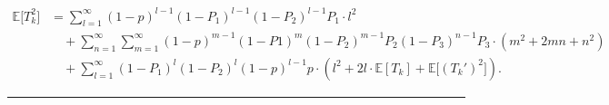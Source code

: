 \documentclass{IEEEtran}
\begin{document}
\begin{figure*}
	\begin{equation}\label{T^2}
	\begin{aligned}
	\mathbb{E}\big[T_k^2\big]&=\sum_{l=1}^{\infty}(1-p)^{l-1}(1-P_1)^{l-1}(1-P_2)^{l-1}P_1\cdot l^2\\
	&\quad + \sum_{n=1}^{\infty}\sum_{m=1}^{\infty}(1-p)^{m-1}(1-P1)^m(1-P_2)^{m-1}P_2(1-P_3)^{n-1}P_3\cdot (m^2+2mn+n^2)\\
	&\quad +\sum_{l=1}^{\infty}(1-P_1)^l(1-P_2)^l(1-p)^{l-1}p\cdot \left(l^2+2l\cdot \mathbb{E}[T_k]+\mathbb{E}\big[(T_k')^2\big]\right).
	\end{aligned}
	\end{equation}	
	\vspace{-0.4cm}
	\noindent\rule[0\baselineskip]{\textwidth}{0.4pt}
\end{figure*}
\end{document}
